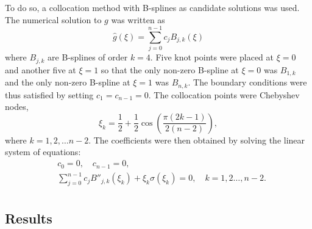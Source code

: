 \documentclass[twocolumn]{article}
\begin{document}
\begin{large}
To do so, a collocation method with B-splines as candidate solutions was used. The numerical solution to $g$ was written as 
\begin{equation}
    \hat{g}(\xi) = \sum_{j=0}^{n-1}c_jB_{j,k}(\xi)
\end{equation}
where $B_{j,k}$ are B-splines of order $k=4$. Five knot points were placed at $\xi=0$ and another five at $\xi=1$ so that the only non-zero B-spline at $\xi=0$ was $B_{1,k}$ and the only non-zero B-spline at $\xi=1$ was $B_{n,k}$. The boundary conditions were thus satisfied by setting $c_1=c_{n-1}=0$. The collocation points were Chebyshev nodes, 
\begin{equation}
    \xi_k = \frac{1}{2} + \frac{1}{2}\cos\left(\frac{\pi(2k-1)}{2(n-2)}\right),
\end{equation}
where $k=1,2,\dots n-2$. The coefficients were then obtained by solving the linear system of equations:
\begin{equation}
    \begin{split}
        &c_0 = 0, \quad c_{n-1} = 0, \\ 
        &\sum_{j=0}^{n-1}c_jB''_{j,k}(\xi_k) + \xi_k\sigma(\xi_k) = 0,\quad k=1,2\dots,n-2. \\ 
    \end{split}
\end{equation}

\subsection*{Results}














\end{large}
\end{document}
